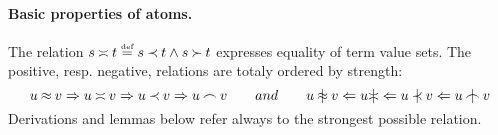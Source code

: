 \paragraph{Basic properties of atoms.}
%
The relation \(s\mathbin{\asymp} t\mathrel {\stackrel {\mbox {\tiny def}}{=}} s\mathbin{\prec} t\land s\mathbin{\succ} t\) expresses equality of term
value sets.
%
\noindent
The positive, resp. negative, relations are totaly ordered by strength:
\begin{equation} \label{eq:rel-order}
u\Eq v  \impl u\Seteq v \impl u\Incl v \impl u\Int v
\hspace{2em} and \hspace{2em}
 u\notEq v \Leftarrow u \notSeteq \Leftarrow
 u\notIncl v \Leftarrow u\notInt v 
\end{equation}
Derivations and lemmas below refer always to the strongest possible relation.
%

